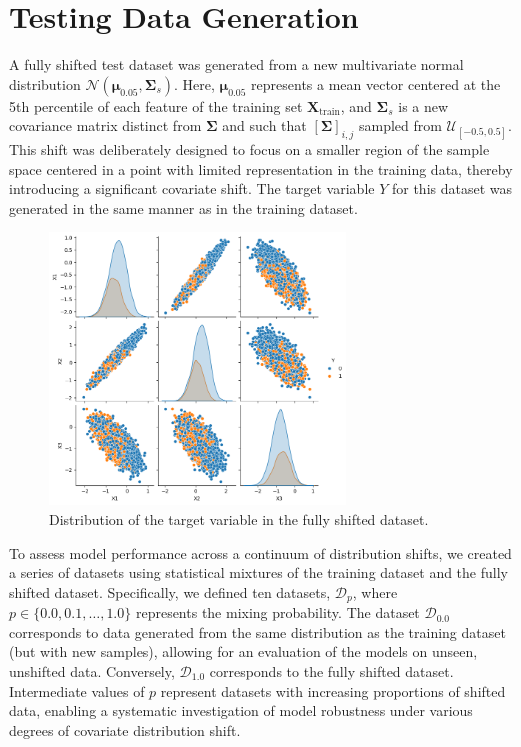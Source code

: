 \section{Testing Data Generation}
A fully shifted test dataset was generated from a new multivariate normal distribution $\mathcal{N}(\boldsymbol{\mu}_{0.05}, \boldsymbol{\Sigma}_s)$. Here, $\boldsymbol{\mu}_{0.05}$ represents a mean vector centered at the 5th percentile of each feature of the training set $\boldsymbol{\mathbf{X}}_\text{train}$, and $\boldsymbol{\Sigma}_s$ is a new covariance matrix distinct from $\boldsymbol{\Sigma}$ and such that $[\boldsymbol{\Sigma}]_{i,j}$ sampled from $\mathcal{U}_{[-0.5, 0.5]}$. This shift was deliberately designed to focus on a smaller region of the sample space centered in a point with limited representation in the training data, thereby introducing a significant covariate shift. The target variable $Y$ for this dataset was generated in the same manner as in the training dataset.

\begin{figure}[H]
    \centering
    \includegraphics[width=0.7\textwidth]{assets/label_dist_fullyshift.png}
    \caption{Distribution of the target variable in the fully shifted dataset.}
    \label{fig:label_dist_fullyshift}
\end{figure}

To assess model performance across a continuum of distribution shifts, we created a series of datasets using statistical mixtures of the training dataset and the fully shifted dataset. Specifically, we defined ten datasets, $\mathcal{D}_p$, where $p \in \{0.0, 0.1, \ldots, 1.0\}$ represents the mixing probability. The dataset $\mathcal{D}_{0.0}$ corresponds to data generated from the same distribution as the training dataset (but with new samples), allowing for an evaluation of the models on unseen, unshifted data. Conversely, $\mathcal{D}_{1.0}$ corresponds to the fully shifted dataset. Intermediate values of $p$ represent datasets with increasing proportions of shifted data, enabling a systematic investigation of model robustness under various degrees of covariate distribution shift.


